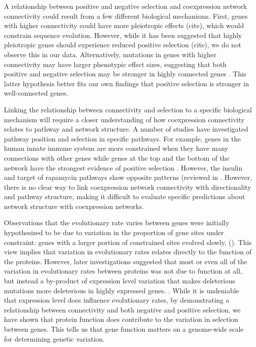 A relationship between positive and negative selection and coexpression network connectivity could result from a few different biological mechanisms. First, genes with higher connectivity could have more pleiotropic effects (cite), which would constrain sequence evolution. However, while it has been suggested that highly pleiotropic genes should experience reduced positive selection (cite), we do not observe this in our data. Alternatively, mutations in genes with higher connectivity may have larger phenotypic effect sizes, suggesting that both positive and negative selection may be stronger in highly connected genes \citep{Olson-Manning2012-ap}. This latter hypothesis better fits our own findings that positive selection is stronger in well-connected genes.

Linking the relationship between connectivity and selection to a specific biological mechanism will require a closer understanding of how coexpression connectivity relates to pathway and network structure. A number of studies have investigated pathway position and selection in specific pathways. For example, genes in the human innate immune system are more constrained when they have many connections with other genes while genes at the top and the bottom of the network have the strongest evidence of positive selection \citep{Casals2011-jz}. However, the insulin and target of rapamycin pathways show opposite patterns (reviewed in \citep{Olson-Manning2013-op}. However, there is no clear way to link coexpression network connectivity with directionality and pathway structure, making it difficult to evaluate specific predictions about network structure with coexpression networks.

Observations that the evolutionary rate varies between genes were initially hypothesized to be due to variation in the proportion of gene sites under constraint: genes with a larger portion of constrained sites evolved slowly. (\citep{Kimura1977-ib}). This view implies that variation in evolutionary rates relates directly to the function of the proteins. However, later investigations suggested that most or even all of the variation in evolutionary rates between proteins was not due to function at all, but instead a by-product of expression level variation that makes deleterious mutations more deleterious in highly expressed genes. \citep{Drummond2006-pa,Zhang2015-ne}. While it is undeniable that expression level does influence evolutionary rates, by demonstrating a relationship between connectivity and both negative and positive selection, we have shown that protein function does contribute to the variation in selection between genes. This tells us that gene function matters on a genome-wide scale for determining genetic variation. 


